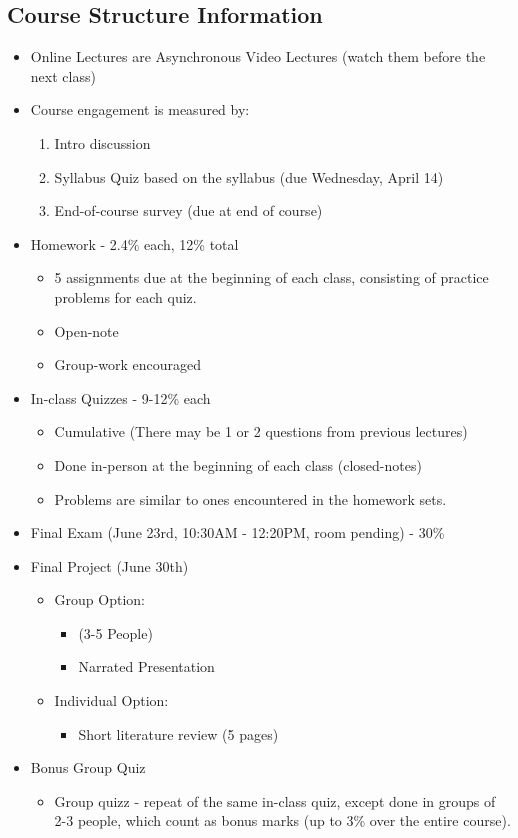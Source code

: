 \documentclass[12pt]{article}
\begin{document}
\subsection{Course Structure Information}

\begin{itemize}
  \item Online Lectures are Asynchronous Video Lectures (watch them before the
    next class)
  \item Course engagement is measured by:
    \begin{enumerate}
      \item Intro discussion
      \item Syllabus Quiz based on the syllabus (due Wednesday, April 14)
      \item End-of-course survey (due at end of course)
    \end{enumerate}
  \item Homework - 2.4\% each, 12\% total
    \begin{itemize}
      \item 5 assignments due at the beginning of each class, consisting of 
        practice problems for each quiz.
      \item Open-note
      \item Group-work encouraged
    \end{itemize}
  \item In-class Quizzes - 9-12\% each
    \begin{itemize}
      \item Cumulative (There may be 1 or 2 questions from previous lectures)
      \item Done in-person at the beginning of each class (closed-notes)
      \item Problems are similar to ones encountered in the homework sets.
    \end{itemize}
  \item Final Exam (June 23rd, 10:30AM - 12:20PM, room pending) - 30\%
  \item Final Project (June 30th)
    \begin{itemize}
      \item Group Option:
        \begin{itemize}
          \item (3-5 People)
          \item Narrated Presentation
        \end{itemize}
      \item Individual Option:
        \begin{itemize}
          \item Short literature review (5 pages)
        \end{itemize}
    \end{itemize}
  \item Bonus Group Quiz
    \begin{itemize}
      \item Group quizz - repeat of the same in-class quiz, except done in
        groups of 2-3 people, which count as bonus marks (up to 3\% over the
        entire course).
    \end{itemize}
\end{itemize}
\end{document}
